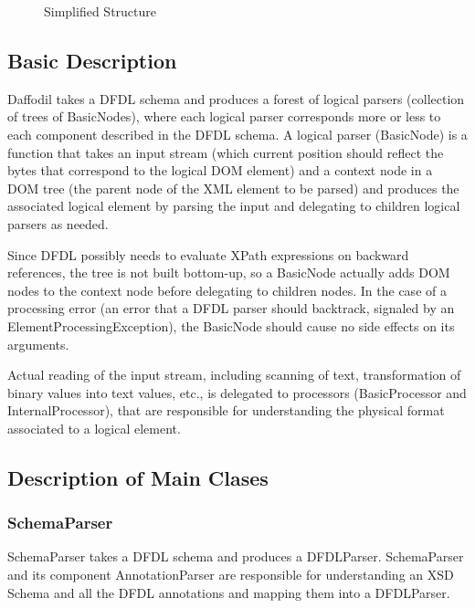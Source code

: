 \documentclass[a4paper,10pt]{article}
\begin{document}
\begin{figure}[htp]
\hspace{-1.5cm}
\caption{Simplified Structure}
\end{figure}

\subsection{Basic Description}
Daffodil takes a DFDL schema and produces a forest of logical parsers (collection of trees of BasicNodes), where each logical parser corresponds more or less to each component described in the DFDL schema. A logical parser (BasicNode) is a function that takes an input stream (which current position should reflect the bytes that correspond to the logical DOM element) and a context node in a DOM tree (the parent node of the XML element to be parsed) and produces the associated logical element by parsing the input and delegating to children logical parsers as needed.

Since DFDL possibly needs to evaluate XPath expressions on backward references, the tree is not built bottom-up, so a BasicNode actually adds DOM nodes to the context node before delegating to children nodes. In the case of a processing error (an error that a DFDL parser should backtrack, signaled by an ElementProcessingException), the BasicNode should cause no side effects on its arguments.

Actual reading of the input stream, including scanning of text, transformation of binary values into text values, etc., is delegated to processors (BasicProcessor and InternalProcessor), that are responsible for understanding the physical format associated to a logical element.
 
\subsection{Description of Main Clases}

\subsubsection{SchemaParser}

SchemaParser takes a DFDL schema and produces a DFDLParser. SchemaParser and its component AnnotationParser are responsible for understanding an XSD Schema and all the DFDL annotations and mapping them into a DFDLParser.
\end{document}
